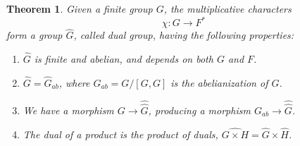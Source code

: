 \documentclass[12pt]{amsbook}
\newtheorem{theorem}{Theorem}[chapter]
\begin{document}
\begin{theorem}
Given a finite group $G$, the multiplicative characters 
$$\chi:G\to F^*$$
form a group $\widehat{G}$, called dual group, having the following properties:
\begin{enumerate}
\item $\widehat{G}$ is finite and abelian, and depends on both $G$ and $F$.

\item $\widehat{G}=\widehat{G}_{ab}$, where $G_{ab}=G/[G,G]$ is the abelianization of $G$.

\item We have a morphism $G\to\widehat{\widehat{G}}$, producing a morphism $G_{ab}\to\widehat{\widehat{G}}$.

\item The dual of a product is the product of duals, $\widehat{G\times H}=\widehat{G}\times\widehat{H}$.
\end{enumerate}
\end{theorem}
\end{document}
